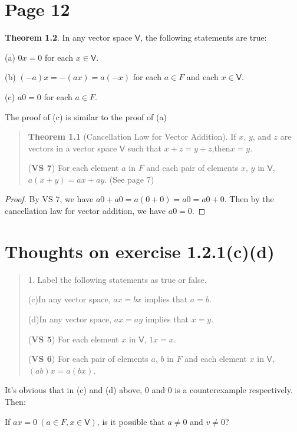 \documentclass{article}
\newcommand{\0}{\mathit{0}}
\newcommand{\V}{\mathsf{V}}
\begin{document}
\section{Page 12}
\textbf{Theorem 1.2}. In any vector space $\V$, the following statements are true:

(a) $0x = \0$ for each $x \in \V$.

(b) $(-a)x = -(ax)=a(-x)$ for each $a \in F$ and each $x \in \V$.

(c) $a\0 = \0$ for each $a \in F$.

The proof of (c) is similar to the proof of (a)

\begin{quotation}
    \textbf{Theorem 1.1} (Cancellation Law for Vector Addition). If $x$, $y$,
    and $z$ are vectors in a vector space $\V$ such that $x+z = y +z$,then$x = y$.

    (\textbf{VS 7}) For each element $a$ in $F$ and each pair of elements $x$, $y$ in $\V$,
    $a(x +y)=ax+ay$. (See page 7)
\end{quotation}

\begin{proof}
    By VS 7, we have $a\0+a\0=a(\0+\0)=a\0=a\0+\0$.
    Then by the cancellation law for vector addition, we have $a\0 = \0$.
\end{proof}

\section{Thoughts on exercise 1.2.1(c)(d)}

\begin{quotation}

    1. Label the following statements as true or false.

    (c)In any vector space, $ax = bx$ implies that $a = b$.

    (d)In any vector space, $ax = ay$ implies that $x = y$.

    (\textbf{VS 5}) For each element $x$ in $\V$, $1x = x$.

    (\textbf{VS 6}) For each pair of elements $a$, $b$ in $F$ and each element $x$ in $\V$,
    $(ab)x = a(bx)$.

\end{quotation}

It's obvious that in (c) and (d) above, $0$ and $\0$ is a counterexample respectively. Then:

If $ax=\0\ (a\in F,x\in\V)$, is it possible that $a\neq0$ and $v\neq\0$?
\end{document}

